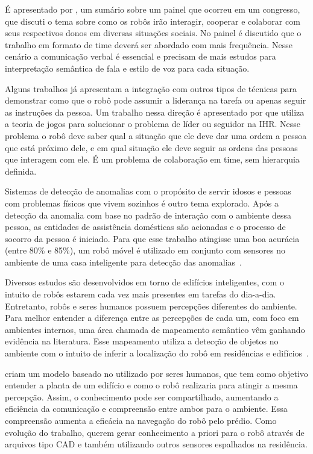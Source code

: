 É apresentado por \textcite{lampe:2016}, um sumário sobre um painel que ocorreu em um congresso, que discuti o tema sobre como os robôs irão interagir, cooperar e colaborar com seus respectivos donos em diversas situações sociais. No painel é discutido que o trabalho em formato de time deverá ser abordado com mais frequência. Nesse cenário a comunicação verbal é essencial e precisam de mais estudos para interpretação semântica de fala e estilo de voz para cada situação.

Alguns trabalhos já apresentam a integração com outros tipos de técnicas para demonstrar como que o robô pode assumir a liderança na tarefa ou apenas seguir as instruções da pessoa. Um trabalho nessa direção é apresentado por \textcite{li:2015} que utiliza a teoria de jogos para solucionar o problema de líder ou seguidor na IHR. Nesse problema o robô deve saber qual a situação que ele deve dar uma ordem a pessoa que está próximo dele, e em qual situação ele deve seguir as ordens das pessoas que interagem com ele. É um problema de colaboração em time, sem hierarquia definida.

Sistemas de detecção de anomalias com o propósito de servir idosos e pessoas com problemas físicos que vivem sozinhos é outro tema explorado. Após a detecção da anomalia com base no padrão de interação com o ambiente dessa pessoa, as entidades de assistência domésticas são acionadas e o processo de socorro da pessoa é iniciado. Para que esse trabalho atingisse uma boa acurácia (entre 80\% e 85\%), um robô móvel é utilizado em conjunto com sensores no ambiente de uma casa inteligente para detecção das anomalias~\cite{lundstrom:2015}.

Diversos estudos são desenvolvidos em torno de edifícios inteligentes, com o intuito de robôs estarem cada vez mais presentes em tarefas do dia-a-dia. Entretanto, robôs e seres humanos possuem percepções diferentes do ambiente. Para melhor entender a diferença entre as percepções de cada um, com foco em ambientes internos, uma área chamada de mapeamento semântico vêm ganhando evidência na literatura. Esse mapeamento utiliza a detecção de objetos no ambiente com o intuito de inferir a localização do robô em residências e edifícios~\cite{turek:2017}.

\textcite{turek:2017} criam um modelo baseado no utilizado por seres humanos, que tem como objetivo entender a planta de um edifício e como o robô realizaria para atingir a mesma percepção. Assim, o conhecimento pode ser compartilhado, aumentando a eficiência da comunicação e compreensão entre ambos para o ambiente. Essa compreensão aumenta a eficácia na navegação do robô pelo prédio. Como evolução do trabalho, \textcite{turek:2017} querem gerar conhecimento a priori para o robô através de arquivos tipo CAD e também utilizando outros sensores espalhados na residência.

